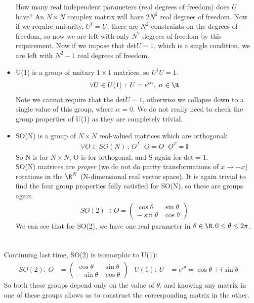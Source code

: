 \documentclass[relqm.tex]{subfiles}
\begin{document}
\begin{itemize}
        How many real independent parameters (real degrees of freedom) does $U$ have?
        An $N\times N$ complex matrix will have $2N^2$ real degrees of freedom. 
        Now if we require unitarity, $U^\dagger = U$, there are $N^2$ constraints on the degrees of freedom, so now we are left with only $N^2$ degrees of freedom by this requirement. 
        Now if we impose that $\text{det}U = 1$, which is a single condition, we are left with $N^2-1$ real degrees of freedom. 
    \item U(1) is a group of unitary $1\times1$ matrices, so $U^\dagger U = 1$. 
        \begin{align}
            \forall U \in U(1)\,:\, U = e^{i\alpha},\; \alpha \in \R
        \end{align}
        Note we cannot require that the $\text{det}U=1$, otherwise we collapse down to a single value of this group, where $\alpha=0$.
        We do not really need to check the group properties of U(1) as they are completely trivial.
    \item SO(N) is a group of $N\times N$ real-valued matrices which are orthogonal:
        \begin{align}
            \forall O \in SO(N)\,:\, O^T\cdot O = O\cdot O^T = \mathbb{I}
        \end{align}
        So N is for $N\times N$, O is for orthogonal, and S again for $\text{det}=1$.\\
        SO(N) matrices are \emph{proper} (we do not do parity transformations of $x\to -x$) rotations in the $\R^N$ (N-dimensional real vector space).
        It is again trivial to find the four group properties fully satisfied for SO(N), so these are groups again.
        \begin{align}
            SO(2) \ni O = \begin{pmatrix} \cos\theta & \sin\theta \\ -\sin\theta & \cos\theta\end{pmatrix}
        \end{align}
        We can see that for SO(2), we have one real parameter in $\theta\in\R,0\leq\theta\leq2\pi$.
\end{itemize}

\chapter{}
Continuing last time, SO(2) is isomorphic to U(1):
\begin{align}
    SO(2):~ O &= \begin{pmatrix}\cos\theta & \sin\theta \\ -\sin\theta & \cos\theta\end{pmatrix} & U(1):~ U &= e^{i\theta} = \cos\theta + i\sin\theta
\end{align}
So both these groups depend only on the value of $\theta$, and knowing any matrix in one of these groups allows us to construct the corresponding matrix in the other.
\end{document}
